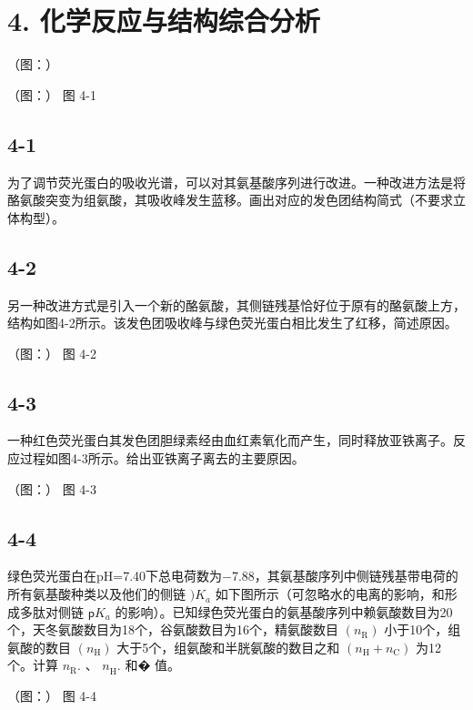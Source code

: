 \section*{4. 化学反应与结构综合分析}
（图：）

（图：）
图 4-1

\subsection*{4-1}
为了调节荧光蛋⽩的吸收光谱，可以对其氨基酸序列进⾏改进。⼀种改进⽅法是将酪氨酸突变为组氨酸，其吸收峰发⽣蓝移。画出对应的发⾊团结构简式（不要求⽴体构型）。

\subsection*{4-2}
另⼀种改进⽅式是引⼊⼀个新的酪氨酸，其侧链残基恰好位于原有的酪氨酸上⽅，结构如图4-2所⽰。该发⾊团吸收峰与绿⾊荧光蛋⽩相⽐发⽣了红移，简述原因。

（图：）
图 4-2

\subsection*{4-3}
⼀种红⾊荧光蛋⽩其发⾊团胆绿素经由⾎红素氧化⽽产⽣，同时释放亚铁离⼦。反应过程如图4-3所⽰。给出亚铁离⼦离去的主要原因。

（图：）
图 4-3

\subsection*{4-4}
绿⾊荧光蛋⽩在pH=7.40下总电荷数为−7.88，其氨基酸序列中侧链残基带电荷的所有氨基酸种类以及他们的侧链 $) K _ { a }$ 如下图所⽰（可忽略⽔的电离的影响，和形成多肽对侧链 $\mathsf { p } K _ { a }$ 的影响）。已知绿⾊荧光蛋⽩的氨基酸序列中赖氨酸数⽬为20个，天冬氨酸数⽬为18个，⾕氨酸数⽬为16个，精氨酸数⽬ $\left( n _ { \mathrm { R } } \right)$ ⼩于10个，组氨酸的数⽬ $( n _ { \mathrm { H } } )$ ⼤于5个，组氨酸和半胱氨酸的数⽬之和 $( n _ { \mathrm { H } } + n _ { \mathrm { C } } )$ 为12个。计算 $n _ { \mathrm { R } } .$ 、 $n _ { \mathrm { H } } ^ { \mathrm { } } .$ 和� 值。

（图：）
图 4-4
